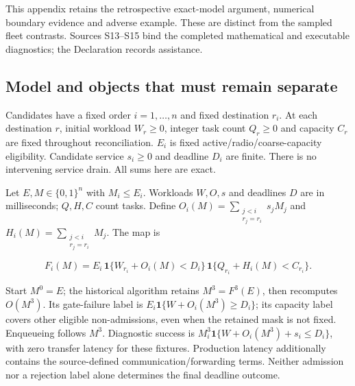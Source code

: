 \documentclass[12pt,a4paper]{article}
\begin{document}
This appendix retains the retrospective exact-model argument, numerical boundary evidence and adverse example. These are distinct from the sampled fleet contrasts. Sources S13--S15 bind the completed mathematical and executable diagnostics; the Declaration records assistance.

\FloatBarrier
\subsection{Model and objects that must remain separate}\label{sec:C.1}

Candidates have a fixed order $i=1,\ldots,n$ and fixed destination $r_i$. At each destination $r$, initial workload $W_r\geq0$, integer task count $Q_r\geq0$ and capacity $C_r$ are fixed throughout reconciliation. $E_i$ is fixed active/radio/coarse-capacity eligibility. Candidate service $s_i\geq0$ and deadline $D_i$ are finite. There is no intervening service drain. All sums here are exact.

Let $E,M\in\{0,1\}^{n}$ with $M_i\leq E_i$. Workloads $W,O,s$ and deadlines $D$ are in milliseconds; $Q,H,C$ count tasks. Define $O_i(M)=\sum_{\substack{j<i\\r_j=r_i}}s_jM_j$ and $H_i(M)=\sum_{\substack{j<i\\r_j=r_i}}M_j$. The map is

\begin{equation}\tag{C1}\label{eq:C1}
 F_i(M)=E_i\,\mathbf{1}\{W_{r_i}+O_i(M)<D_i\}\,\mathbf{1}\{Q_{r_i}+H_i(M)<C_{r_i}\}.
\end{equation}

Start $M^{0}=E$; the historical algorithm retains $M^{3}=F^{3}(E)$, then recomputes $O(M^{3})$. Its gate-failure label is $E_i\mathbf{1}\{W+O_i(M^{3})\geq D_i\}$; its capacity label covers other eligible non-admissions, even when the retained mask is not fixed. Enqueueing follows $M^{3}$. Diagnostic success is $M_i^{3}\mathbf{1}\{W+O_i(M^{3})+s_i\leq D_i\}$, with zero transfer latency for these fixtures. Production latency additionally contains the source-defined communication/forwarding terms. Neither admission nor a rejection label alone determines the final deadline outcome.
\end{document}

